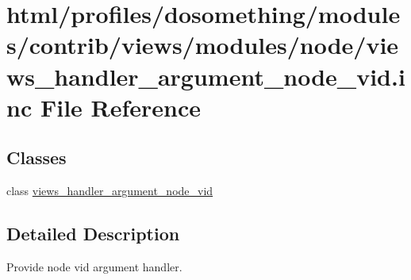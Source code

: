 \hypertarget{views__handler__argument__node__vid_8inc}{
\section{html/profiles/dosomething/modules/contrib/views/modules/node/views\_\-handler\_\-argument\_\-node\_\-vid.inc File Reference}
\label{views__handler__argument__node__vid_8inc}
}
\subsection*{Classes}
\begin{DoxyCompactItemize}
\item 
class \hyperlink{classviews__handler__argument__node__vid}{views\_\-handler\_\-argument\_\-node\_\-vid}
\end{DoxyCompactItemize}


\subsection{Detailed Description}
Provide node vid argument handler. 